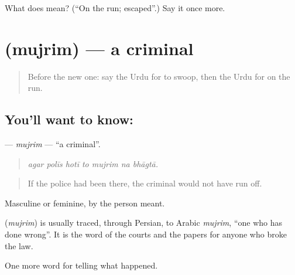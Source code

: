 \begin{tcolorbox}[breakable,colback=teal!4,colframe=teal!35!black,title={Before you move on}]
What does  mean? (\textquotedblleft{}On the run; escaped\textquotedblright{}.) Say it once more.
\end{tcolorbox}
\section[\texorpdfstring{\ur{مجرم} (mujrim)}{مجرم (mujrim)}]{ (mujrim) — a criminal}

\label{lesson:UR-C277-mujrim}



\begin{quote}
Before the new one: say the Urdu for to swoop, then the Urdu for on the run.
\end{quote}

\subsection*{You'll want to know: }
\textbf{} — \emph{mujrim} — \textquotedblleft{}a criminal\textquotedblright{}.

\begin{quote}
      
\end{quote}

\begin{quote}
\emph{agar polīs hotī to mujrim na bhāgtā.}
\end{quote}

\begin{quote}
If the police had been there, the criminal would not have run off.
\end{quote}

Masculine or feminine, by the person meant.

\begin{cousinweb}
\textbf{} (\emph{mujrim}) is usually traced, through Persian, to Arabic \emph{mujrim}, \textquotedblleft{}one who has done wrong\textquotedblright{}. It is the word of the courts and the papers for anyone who broke the law.
\end{cousinweb}

\begin{grammarlens}[title={What you've built}]
One more word for telling what happened.
\end{grammarlens}

